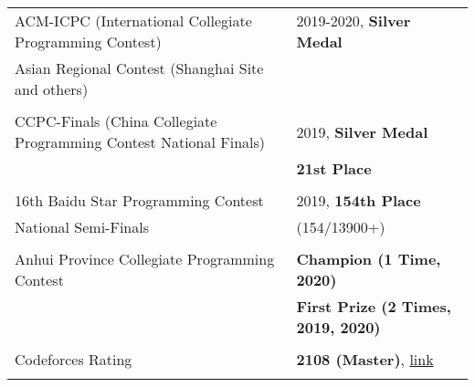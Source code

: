 \documentclass[a4paper,12pt]{article}
\begin{document}
\begin{tabularx}{\linewidth}{@{}l X@{}}
ACM-ICPC (International Collegiate Programming Contest) & 2019-2020, \textbf{Silver Medal}\\
\normalsize{Asian Regional Contest (Shanghai Site and others)}\\
\\
CCPC-Finals (China Collegiate Programming Contest National Finals) & \normalsize{2019, \textbf{Silver Medal}}\\
& \normalsize{\textbf{21st Place}}\\
\\
16th Baidu Star Programming Contest & \normalsize{2019, \textbf{154th Place}}\\
\normalsize{National Semi-Finals}&(154/13900+)\\
\\
Anhui Province Collegiate Programming Contest & \normalsize{\textbf{Champion (1 Time, 2020)}}\\
& \normalsize{\textbf{First Prize (2 Times, 2019, 2020)}}\\
\\
Codeforces Rating & \normalsize{\textbf{2108 (Master)}, \href{https://codeforces.com/profile/QieziMin}{link}}\\
\\
\end{tabularx}




\vfill
{}
\end{document}
